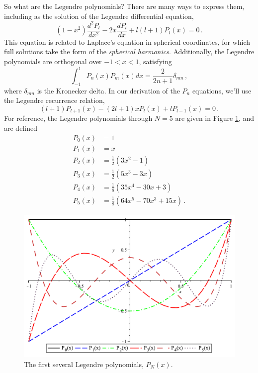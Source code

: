 So what are the Legendre polynomials?  There are many ways to express them, including as the solution of the Legendre differential equation,
\begin{equation}
 (1-x^2) \frac{d^2 P_l}{dx^2} - 2x\frac{dP_l}{dx} + l(l+1)P_l(x) = 0 \, .
\end{equation}
This equation is related to Laplace's equation in spherical coordinates, for which full solutions take the form of the \textit{spherical harmonics}.  Additionally, the Legendre polynomials are orthogonal over $-1 < x < 1$, satisfying
\begin{equation}
 \int^{1}_{-1} P_n(x)P_m(x) dx = \frac{2}{2n+1} \delta_{mn} \, ,
 \label{eq:legpolyorth}
\end{equation}
 where $\delta_{mn}$ is the Kronecker delta.  In our derivation of the $P_n$ equations, we'll use the Legendre recurrence relation,
\begin{equation}
 (l+1)P_{l+1} (x) - (2l+1)xP_l(x) + lP_{l-1}(x) = 0 \, .
 \label{eq:legpolyrecur}
\end{equation}
For reference, the Legendre polynomials through $N=5$ are given in Figure \ref{fig:legendre_polynomials}, and are defined
\begin{equation}
 \begin{split}
  P_0(x) &= 1 \\
  P_1(x) &= x \\
  P_2(x) &= \frac{1}{2}(3x^2 - 1) \\
  P_3(x) &= \frac{1}{2}(5x^3 - 3x) \\
  P_4(x) &= \frac{1}{8}(35x^4 - 30x + 3) \\
  P_5(x) &= \frac{1}{8}(64x^5 - 70x^3 + 15x) \, .
 \end{split}
 \label{eq:legpolys}
\end{equation}
\begin{figure}[ht] 
    \centering
    \includegraphics[keepaspectratio, width = 5.0 in]{images/legendre_polynomials}
    \caption{The first several Legendre polynomials, $P_N(x)$.}
    \label{fig:legendre_polynomials}
\end{figure}

